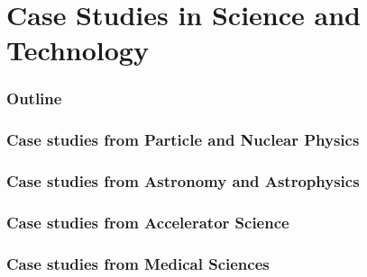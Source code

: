 \renewcommand{\thispart}{10 }
\renewcommand{\thispartname}{Case Studies in Science and Technology}

\part{\thispartname}

\section{Outline}




%
%

\section{Case studies from Particle and Nuclear Physics}

\section{Case studies from Astronomy and Astrophysics}

\section{Case studies from Accelerator Science}

\section{Case studies from Medical Sciences}

